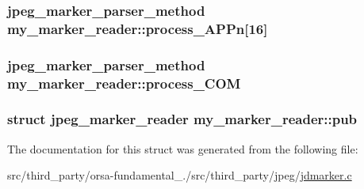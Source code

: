 \subsubsection[{process\+\_\+\+A\+P\+Pn}]{\setlength{\rightskip}{0pt plus 5cm}jpeg\+\_\+marker\+\_\+parser\+\_\+method my\+\_\+marker\+\_\+reader\+::process\+\_\+\+A\+P\+Pn\mbox{[}16\mbox{]}}\label{structmy__marker__reader_a3a466da71db30199ab019a03960013cc}
\hypertarget{structmy__marker__reader_a5e10e69e117d23840f04d54e7a3cdde5}{}
\subsubsection[{process\+\_\+\+C\+O\+M}]{\setlength{\rightskip}{0pt plus 5cm}jpeg\+\_\+marker\+\_\+parser\+\_\+method my\+\_\+marker\+\_\+reader\+::process\+\_\+\+C\+O\+M}\label{structmy__marker__reader_a5e10e69e117d23840f04d54e7a3cdde5}
\hypertarget{structmy__marker__reader_ac0d8a24c85575d304ef4383e8f6ca5fc}{}
\subsubsection[{pub}]{\setlength{\rightskip}{0pt plus 5cm}struct {\bf jpeg\+\_\+marker\+\_\+reader} my\+\_\+marker\+\_\+reader\+::pub}\label{structmy__marker__reader_ac0d8a24c85575d304ef4383e8f6ca5fc}


The documentation for this struct was generated from the following file\+:\begin{DoxyCompactItemize}
\item 
src/third\+\_\+party/orsa-\/fundamental\+\_./src/third\+\_\+party/jpeg/\hyperlink{jdmarker_8c}{jdmarker.\+c}\end{DoxyCompactItemize}

